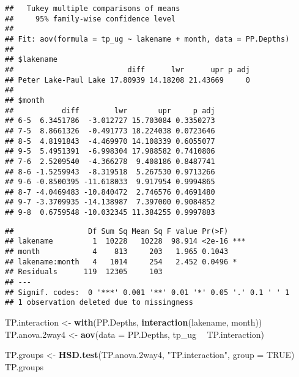 \documentclass[]{article}
\newenvironment{Shaded}{\begin{snugshade}}{\end{snugshade}}
\newcommand{\KeywordTok}[1]{\textcolor[rgb]{0.13,0.29,0.53}{\textbf{#1}}}
\newcommand{\DataTypeTok}[1]{\textcolor[rgb]{0.13,0.29,0.53}{#1}}
\newcommand{\StringTok}[1]{\textcolor[rgb]{0.31,0.60,0.02}{#1}}
\newcommand{\CommentTok}[1]{\textcolor[rgb]{0.56,0.35,0.01}{\textit{#1}}}
\newcommand{\OtherTok}[1]{\textcolor[rgb]{0.56,0.35,0.01}{#1}}
\newcommand{\OperatorTok}[1]{\textcolor[rgb]{0.81,0.36,0.00}{\textbf{#1}}}
\newcommand{\NormalTok}[1]{#1}
\begin{document}
\begin{verbatim}
##   Tukey multiple comparisons of means
##     95% family-wise confidence level
## 
## Fit: aov(formula = tp_ug ~ lakename + month, data = PP.Depths)
## 
## $lakename
##                          diff      lwr      upr p adj
## Peter Lake-Paul Lake 17.80939 14.18208 21.43669     0
## 
## $month
##           diff        lwr       upr     p adj
## 6-5  6.3451786  -3.012727 15.703084 0.3350273
## 7-5  8.8661326  -0.491773 18.224038 0.0723646
## 8-5  4.8191843  -4.469970 14.108339 0.6055077
## 9-5  5.4951391  -6.998304 17.988582 0.7410806
## 7-6  2.5209540  -4.366278  9.408186 0.8487741
## 8-6 -1.5259943  -8.319518  5.267530 0.9713266
## 9-6 -0.8500395 -11.618033  9.917954 0.9994865
## 8-7 -4.0469483 -10.840472  2.746576 0.4691480
## 9-7 -3.3709935 -14.138987  7.397000 0.9084852
## 9-8  0.6759548 -10.032345 11.384255 0.9997883
\end{verbatim}

\begin{Shaded}
\end{Shaded}

\begin{verbatim}
##                 Df Sum Sq Mean Sq F value Pr(>F)    
## lakename         1  10228   10228  98.914 <2e-16 ***
## month            4    813     203   1.965 0.1043    
## lakename:month   4   1014     254   2.452 0.0496 *  
## Residuals      119  12305     103                   
## ---
## Signif. codes:  0 '***' 0.001 '**' 0.01 '*' 0.05 '.' 0.1 ' ' 1
## 1 observation deleted due to missingness
\end{verbatim}

\begin{Shaded}
\begin{Highlighting}[]
\NormalTok{TP.interaction <-}\StringTok{ }\KeywordTok{with}\NormalTok{(PP.Depths, }\KeywordTok{interaction}\NormalTok{(lakename, month))}
\NormalTok{TP.anova.2way4 <-}\StringTok{ }\KeywordTok{aov}\NormalTok{(}\DataTypeTok{data =}\NormalTok{ PP.Depths, tp_ug }\OperatorTok{~}\StringTok{ }\NormalTok{TP.interaction)}

\NormalTok{TP.groups <-}\StringTok{ }\KeywordTok{HSD.test}\NormalTok{(TP.anova.2way4, }\StringTok{"TP.interaction"}\NormalTok{, }\DataTypeTok{group =} \OtherTok{TRUE}\NormalTok{)}
\NormalTok{TP.groups}
\end{Highlighting}
\end{Shaded}
\end{document}
